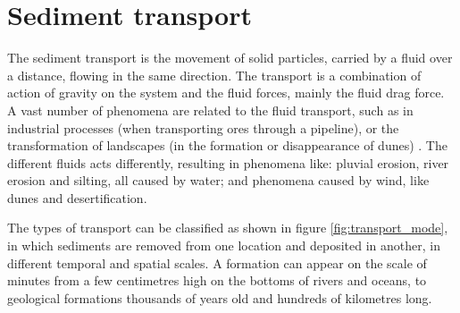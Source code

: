 \chapter{Sediment transport}
\label{chap:Transporte-Sedimentos}

    The sediment transport is the movement of solid particles, carried by a fluid over a distance, flowing in the same direction. The transport is a combination of action of gravity on the system and the fluid forces, mainly the fluid drag force. A vast number of phenomena are related to the fluid transport, such as in industrial processes (when transporting ores through a pipeline), or the transformation of landscapes (in the formation or disappearance of dunes) \cite{Granular_Media_Between_Fluid_and_Solid}. The different fluids acts differently, resulting in phenomena like: pluvial erosion, river erosion and silting, all caused by water; and phenomena caused by wind, like dunes and desertification. 


    The types of transport can be classified as shown in figure \ref{fig:transport_mode}, in which sediments are removed from one location and deposited in another, in different temporal and spatial scales. A formation can appear on the scale of minutes from a few centimetres high on the bottoms of rivers and oceans, to geological formations thousands of years old and hundreds of kilometres long.

